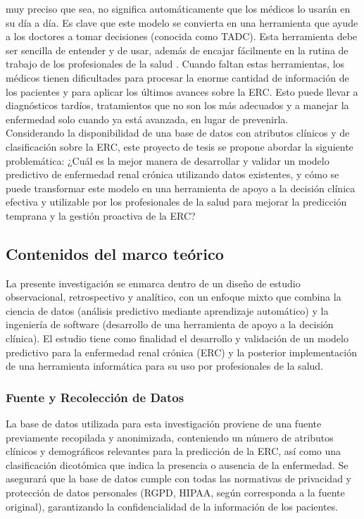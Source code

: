 \documentclass{article}
\begin{document}
muy preciso que sea, no significa automáticamente que los
médicos lo usarán en su día a día. Es clave que este modelo
se convierta en una herramienta que ayude a los doctores a
tomar decisiones (conocida como TADC). Esta herramienta debe
ser sencilla de entender y de usar, además de encajar
fácilmente en la rutina de trabajo de los profesionales de
la salud \cite{AETSA}. Cuando faltan estas herramientas, los
médicos tienen dificultades para procesar la enorme cantidad
de información de los pacientes y para aplicar los últimos
avances sobre la ERC. Esto puede llevar a diagnósticos
tardíos, tratamientos que no son los más adecuados y a
manejar la enfermedad solo cuando ya está avanzada, en lugar
de prevenirla.\\
Considerando la disponibilidad de una base de datos con
atributos clínicos y de clasificación sobre la ERC, este
proyecto de tesis se propone abordar la siguiente
problemática: ¿Cuál es la mejor manera de desarrollar y validar un modelo
predictivo de enfermedad renal crónica utilizando datos
existentes, y cómo se puede transformar este modelo en una
herramienta de apoyo a la decisión clínica efectiva y
utilizable por los profesionales de la salud para mejorar la
predicción temprana y la gestión proactiva de la ERC?\\

\subsection{Contenidos del marco teórico}
La presente investigación se enmarca dentro de un diseño de
estudio observacional, retrospectivo y analítico, con un
enfoque mixto que combina la ciencia de datos (análisis
predictivo mediante aprendizaje automático) y la ingeniería
de software (desarrollo de una herramienta de apoyo a la
decisión clínica). El estudio tiene como finalidad el
desarrollo y validación de un modelo predictivo para la
enfermedad renal crónica (ERC) y la posterior implementación
de una herramienta informática para su uso por profesionales
de la salud.

\subsubsection{Fuente y Recolección de Datos}
La base de datos utilizada para esta investigación proviene
de una fuente previamente recopilada y anonimizada,
conteniendo un número de atributos clínicos y demográficos
relevantes para la predicción de la ERC, así como una
clasificación dicotómica que indica la presencia o ausencia
de la enfermedad. Se asegurará que la base de datos cumple
con todas las normativas de privacidad y protección de datos
personales (RGPD, HIPAA, según corresponda a la fuente
original), garantizando la confidencialidad de la
información de los pacientes.
\end{document}
